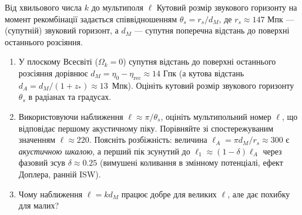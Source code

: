 
\begin{problem}{Від хвильового числа $k$ до мультиполя $\ell$}
Кутовий розмір звукового горизонту на момент рекомбінації
задається співвідношенням $\theta_s = r_s / d_M$, де
$r_s \approx 147$ Мпк --- (супутній) звуковий горизонт, а
$d_M$ --- супутня поперечна відстань до поверхні останнього розсіяння.

\begin{enumerate}
    \item У плоскому Всесвіті ($\Omega_k = 0$) супутня відстань до поверхні
          останнього розсіяння дорівнює $d_M = \eta_0 - \eta_{\text{rec}} \approx 14$ Гпк
          (а кутова відстань $d_A = d_M/(1+z_*)\approx 13$~Мпк).
          Оцініть кутовий розмір звукового горизонту $\theta_s$ в радіанах
          та градусах.
    \item Використовуючи наближення $\ell \approx \pi / \theta_s$,
          оцініть мультипольний номер $\ell$, що відповідає першому
          акустичному піку. Порівняйте зі спостережуваним значенням
          $\ell \approx 220$. Поясніть розбіжність: величина $\ell_A=\pi d_M/r_s\approx300$
          є \emph{акустичною шкалою}, а перший пік зсунутий до $\ell_1\approx(1-\delta)\ell_A$
          через фазовий зсув $\delta\approx0.25$ (вимушені коливання в змінному потенціалі, ефект Доплера, ранній ISW).
    \item Чому наближення $\ell = k d_M$ працює добре для великих $\ell$,
          але дає похибку для малих?
\end{enumerate}
\end{problem}


